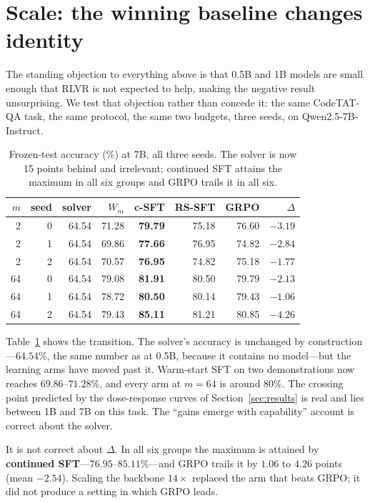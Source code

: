 \section{Scale: the winning baseline changes identity}
\label{sec:scale}

The standing objection to everything above is that 0.5B and 1B models are small
enough that RLVR is not expected to help, making the negative result
unsurprising. We test that objection rather than concede it: the same
CodeTAT-QA task, the same protocol, the same two budgets, three seeds, on
Qwen2.5-7B-Instruct.

\begin{table}[t]
\centering
\small
\setlength{\tabcolsep}{3pt}
\caption{Frozen-test accuracy (\%) at 7B, all three seeds. The solver is now
15 points behind and irrelevant; continued SFT attains the maximum in all six
groups and GRPO trails it in all six.}
\label{tab:scale}
\begin{tabular}{rr rrrrr r}
\toprule
$m$ & seed & solver & $W_m$ & c-SFT & RS-SFT & GRPO & $\Delta$ \\
\midrule
2  & 0 & 64.54 & 71.28 & \textbf{79.79} & 75.18 & 76.60 & $-3.19$ \\
2  & 1 & 64.54 & 69.86 & \textbf{77.66} & 76.95 & 74.82 & $-2.84$ \\
2  & 2 & 64.54 & 70.57 & \textbf{76.95} & 74.82 & 75.18 & $-1.77$ \\
64 & 0 & 64.54 & 79.08 & \textbf{81.91} & 80.50 & 79.79 & $-2.13$ \\
64 & 1 & 64.54 & 78.72 & \textbf{80.50} & 80.14 & 79.43 & $-1.06$ \\
64 & 2 & 64.54 & 79.43 & \textbf{85.11} & 81.21 & 80.85 & $-4.26$ \\
\bottomrule
\end{tabular}
\end{table}

Table~\ref{tab:scale} shows the transition. The solver's accuracy is unchanged
by construction---$64.54\%$, the same number as at 0.5B, because it contains no
model---but the learning arms have moved past it. Warm-start SFT on two
demonstrations now reaches $69.86$--$71.28\%$, and every arm at $m{=}64$ is
around $80\%$. The crossing point predicted by the dose-response curves of
Section~\ref{sec:results} is real and lies between 1B and 7B on this task. The
``gains emerge with capability'' account is correct about the solver.

It is not correct about $\Delta$. In all six groups the maximum is attained by
\textbf{continued SFT}---$76.95$--$85.11\%$---and GRPO trails it by $1.06$ to
$4.26$ points (mean $-2.54$). Scaling the backbone $14\times$ replaced the arm
that beats GRPO; it did not produce a setting in which GRPO leads.

